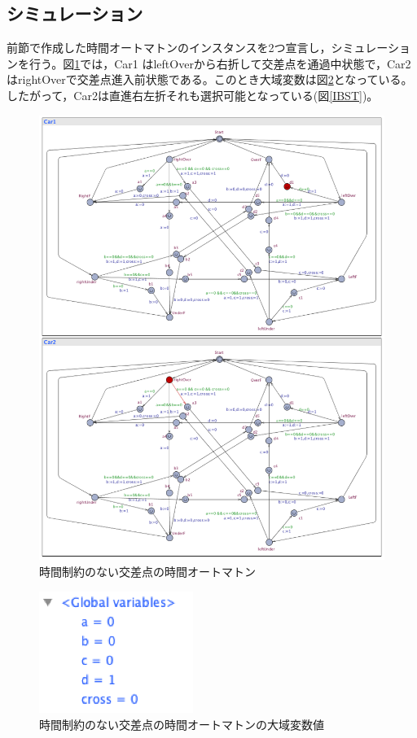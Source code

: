 \documentclass{tpu-sotu}
\begin{document}
	\subsection{シミュレーション}
	前節で作成した時間オートマトンのインスタンスを2つ宣言し，シミュレーションを行う。図\ref{IBSi}では，Car1 はleftOverから右折して交差点を通過中状態で，Car2はrightOverで交差点進入前状態である。このとき大域変数は図\ref{IBSGS}となっている。したがって，Car2は直進右左折それも選択可能となっている(図\ref{IBST})。
	\begin{figure}[htbp]
	\centering
	\includegraphics[width=135mm]{IBSimu.png}
	\caption{時間制約のない交差点の時間オートマトン}
	\label{IBSi}
	\end{figure}
	\begin{figure}[htbp]
	\centering
	\includegraphics[width=50mm]{IBSimuGS.png}
	\caption{時間制約のない交差点の時間オートマトンの大域変数値}
	\label{IBSGS}
	\end{figure}
\end{document}
